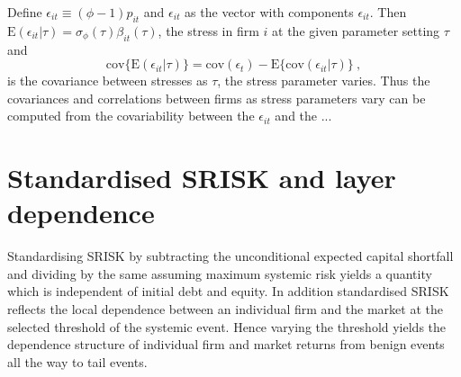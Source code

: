 \documentclass[authoryear]{elsarticle}
\newcommand{\E}{\mathrm{E}}
\newcommand{\e}{\mathrm{e}}
\newcommand{\cov}{\mathrm{cov}}
\newcommand{\eps}{\epsilon}
\newcommand{\Ex}{{\cal E}}
\begin{document}
Define $\eps_{it}\equiv(\phi-1)p_{it}$ and $\eps_{it}$ as the vector with components $\eps_{it}$.  Then $\E(\eps_{it}|\tau)=\sigma_\phi(\tau)\beta_{it}(\tau)$, the stress in firm $i$ at the given parameter setting $\tau$  and
$$
\cov\{\E(\eps_{it}|\tau)\}=\cov(\eps_{t})-\E\{\cov(\eps_{it}|\tau)\}\ ,
$$
is the covariance between stresses as $\tau$, the stress parameter varies.   Thus the covariances and correlations between firms as stress parameters vary can be computed from the covariability between the $\eps_{it}$ and the ...

\section{Standardised SRISK and layer dependence}

Standardising SRISK by subtracting the unconditional expected capital shortfall and dividing by the same assuming maximum systemic risk yields a quantity which is independent of initial debt and equity. In addition standardised SRISK reflects the local dependence between an individual firm and the market at the selected threshold of the systemic event. Hence varying the threshold yields the dependence structure of individual firm and market returns from benign events all the way to tail events.
\end{document}
